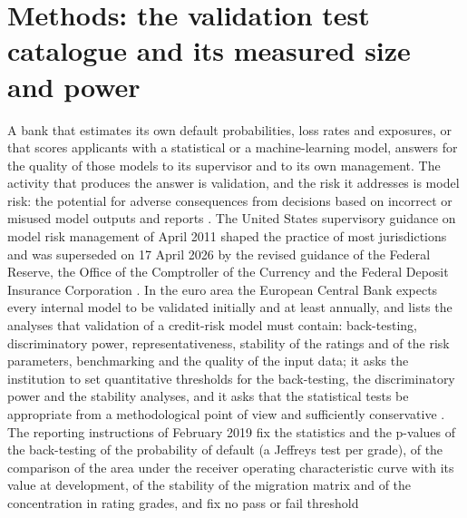 
\providecommand{\vtfn}[1]{\nolinkurl{#1}}

\section{Methods: the validation test catalogue and its measured size and power}
\label{sec:validation-tests}

A bank that estimates its own default probabilities, loss rates and exposures, or that scores applicants with a statistical or a
machine-learning model, answers for the quality of those models to its supervisor and to its own management. The activity that
produces the answer is validation, and the risk it addresses is model risk: the potential for adverse consequences from decisions
based on incorrect or misused model outputs and reports \citep{validation-tests:sr117}. The United States supervisory guidance on
model risk management of April 2011 shaped the practice of most jurisdictions and was superseded on 17 April 2026 by the revised
guidance of the Federal Reserve, the Office of the Comptroller of the Currency and the Federal Deposit Insurance Corporation
\citep{validation-tests:sr262}. In the euro area the European Central Bank expects every internal model to be validated initially and
at least annually, and lists the analyses that validation of a credit-risk model must contain: back-testing, discriminatory power,
representativeness, stability of the ratings and of the risk parameters, benchmarking and the quality of the input data; it asks the
institution to set quantitative thresholds for the back-testing, the discriminatory power and the stability analyses, and it asks that
the statistical tests be appropriate from a methodological point of view and sufficiently conservative \citep{validation-tests:ecb2025egim}.
The reporting instructions of February 2019 fix the statistics and the p-values of the back-testing of the probability of default
(a Jeffreys test per grade), of the comparison of the area under the receiver operating characteristic curve with its value at
development, of the stability of the migration matrix and of the concentration in rating grades, and fix no pass or fail threshold
